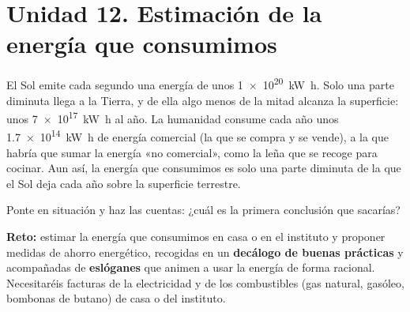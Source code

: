 \section[Unidad 12. La energía que consumimos]{Unidad 12. Estimación de la energía que consumimos}

El Sol emite cada segundo una energía de unos \qty{1e20}{\kilo\watt\hour}. Solo una parte diminuta llega a la Tierra, y de ella algo menos de la mitad alcanza la superficie: unos \qty{7e17}{\kilo\watt\hour} al año. La humanidad consume cada año unos \qty{1.7e14}{\kilo\watt\hour} de energía comercial (la que se compra y se vende), a la que habría que sumar la energía «no comercial», como la leña que se recoge para cocinar. Aun así, la energía que consumimos es solo una parte diminuta de la que el Sol deja cada año sobre la superficie terrestre.

Ponte en situación y haz las cuentas: ¿cuál es la primera conclusión que sacarías?

\begin{marker}
    \textbf{Reto:} estimar la energía que consumimos en casa o en el instituto y proponer medidas de ahorro energético, recogidas en un \textbf{decálogo de buenas prácticas} y acompañadas de \textbf{eslóganes} que animen a usar la energía de forma racional. Necesitaréis facturas de la electricidad y de los combustibles (gas natural, gasóleo, bombonas de butano) de casa o del instituto.
\end{marker}

